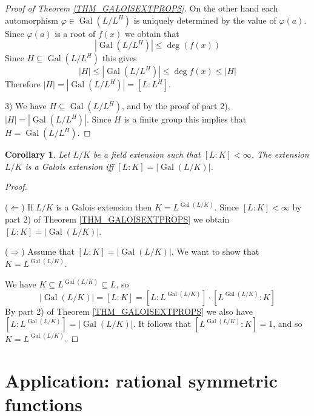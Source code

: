 \documentclass[12pt, letterpaper, oneside]{article}
\theoremstyle{plain}
\newtheorem{corollary}[theorem]{Corollary}
\theoremstyle{definition}
\newcommand{\Gal}{\operatorname{Gal}}
\newcommand{\vs}{\vskip 5mm}
\begin{document}
\begin{proof}[Proof of Theorem \ref{THM_GALOISEXTPROPS}]
On the other hand each automorphism $\varphi\in \Gal(L/L^{H})$ is uniquely determined
by the value of $\varphi(a)$. Since $\varphi(a)$ is a root of $f(x)$ we obtain that 
$$|\Gal(L/L^{H})| \leq \deg (f(x))$$ 
Since $H\subseteq \Gal(L/L^{H})$ this gives
$$|H| \leq |\Gal(L/L^{H})| \leq \deg f(x)  \leq |H|$$
Therefore $|H| = |\Gal(L/L^{H})| =  [L:L^{H}]$.

\vs 

3) We have  $H \subseteq \Gal(L/L^{H})$, and    by the proof of part 2), 
$|H|=|\Gal(L/L^{H})|$. Since $H$ is a finite group this implies that $H = \Gal(L/L^{H})$.


\end{proof}




\begin{corollary}
\label{COR_GALOISEXTCHARCT}
Let $L/K$ be a field extension such that $[L:K]< \infty$. The extension 
 $L/K$ is a Galois extension iff $[L:K] = |\Gal(L/K)|$. 
\end{corollary}


\vs 

\begin{proof} \ 

($\Leftarrow$) If $L/K$ is a Galois extension then $K = L^{\Gal(L/K)}$. Since 
$[L: K]< \infty$ by part 2) of Theorem  \ref{THM_GALOISEXTPROPS} we obtain 
$[L:K] = |\Gal(L/K)|$.

\vs 

($\Rightarrow$)  Assume that $[L:K] = |\Gal(L/K)|$.  We want to show that 
$K = L^{\Gal(L/K)}$.

We have $K \subseteq L^{\Gal(L/K)}\subseteq L$, so
$$ |\Gal(L/K)| = [L:K] = [L: L^{\Gal(L/K)}]\cdot [L^{\Gal(L/K)}:K]$$
By part 2) of Theorem  \ref{THM_GALOISEXTPROPS} we also have 
$[L:L^{\Gal(L/K)}] = |\Gal(L/K)|$. It follows that $[L^{\Gal(L/K)}:K] =1$, 
and so $K = L^{\Gal(L/K)}$. 
\end{proof}











\newpage
\section{Application: rational symmetric functions}
\label{SEC_RATSYMFUNC}
\end{document}
